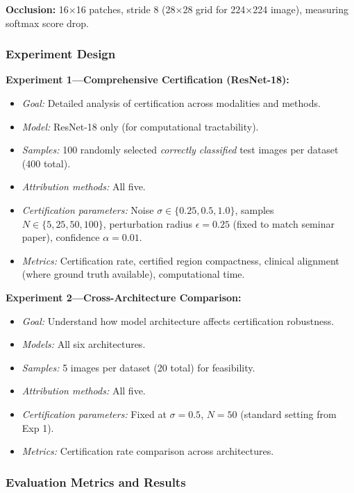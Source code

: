 \documentclass[11pt]{article}
\begin{document}
\textbf{Occlusion:} 16×16 patches, stride 8 (28×28 grid for 224×224 image), measuring softmax score drop.

\subsubsection{Experiment Design}

\textbf{Experiment 1—Comprehensive Certification (ResNet-18):}
\begin{itemize}
    \item \textit{Goal:} Detailed analysis of certification across modalities and methods.
    \item \textit{Model:} ResNet-18 only (for computational tractability).
    \item \textit{Samples:} 100 randomly selected \textit{correctly classified} test images per dataset (400 total).
    \item \textit{Attribution methods:} All five.
    \item \textit{Certification parameters:} Noise $\sigma \in \{0.25, 0.5, 1.0\}$, samples $N \in \{5, 25, 50, 100\}$, perturbation radius $\epsilon = 0.25$ (fixed to match seminar paper), confidence $\alpha = 0.01$.
    \item \textit{Metrics:} Certification rate, certified region compactness, clinical alignment (where ground truth available), computational time.
\end{itemize}

\textbf{Experiment 2—Cross-Architecture Comparison:}
\begin{itemize}
    \item \textit{Goal:} Understand how model architecture affects certification robustness.
    \item \textit{Models:} All six architectures.
    \item \textit{Samples:} 5 images per dataset (20 total) for feasibility.
    \item \textit{Attribution methods:} All five.
    \item \textit{Certification parameters:} Fixed at $\sigma=0.5$, $N=50$ (standard setting from Exp 1).
    \item \textit{Metrics:} Certification rate comparison across architectures.
\end{itemize}

\subsubsection{Evaluation Metrics and Results}
\end{document}
